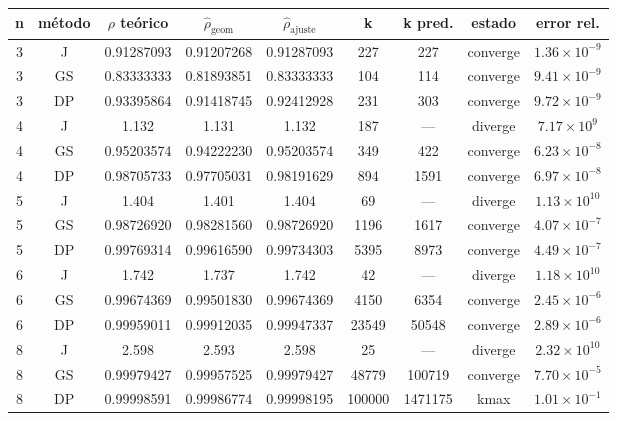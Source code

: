 {\scriptsize
\begin{tabular}{ccccccccc}
\toprule
\rowcolor{Azul1!50}
n & método & $\rho$ teórico & $\hat\rho_{\mathrm{geom}}$ & $\hat\rho_{\mathrm{ajuste}}$ & k & k pred. & estado & error rel. \\
\midrule
3 & J & 0.91287093 & 0.91207268 & 0.91287093 & 227 & 227 & converge & $1.36\times10^{-9}$ \\
3 & GS & 0.83333333 & 0.81893851 & 0.83333333 & 104 & 114 & converge & $9.41\times10^{-9}$ \\
3 & DP & 0.93395864 & 0.91418745 & 0.92412928 & 231 & 303 & converge & $9.72\times10^{-9}$ \\
4 & J & 1.132 & 1.131 & 1.132 & 187 & --- & diverge & $7.17\times10^{9}$ \\
4 & GS & 0.95203574 & 0.94222230 & 0.95203574 & 349 & 422 & converge & $6.23\times10^{-8}$ \\
4 & DP & 0.98705733 & 0.97705031 & 0.98191629 & 894 & 1591 & converge & $6.97\times10^{-8}$ \\
5 & J & 1.404 & 1.401 & 1.404 & 69 & --- & diverge & $1.13\times10^{10}$ \\
5 & GS & 0.98726920 & 0.98281560 & 0.98726920 & 1196 & 1617 & converge & $4.07\times10^{-7}$ \\
5 & DP & 0.99769314 & 0.99616590 & 0.99734303 & 5395 & 8973 & converge & $4.49\times10^{-7}$ \\
6 & J & 1.742 & 1.737 & 1.742 & 42 & --- & diverge & $1.18\times10^{10}$ \\
6 & GS & 0.99674369 & 0.99501830 & 0.99674369 & 4150 & 6354 & converge & $2.45\times10^{-6}$ \\
6 & DP & 0.99959011 & 0.99912035 & 0.99947337 & 23549 & 50548 & converge & $2.89\times10^{-6}$ \\
8 & J & 2.598 & 2.593 & 2.598 & 25 & --- & diverge & $2.32\times10^{10}$ \\
8 & GS & 0.99979427 & 0.99957525 & 0.99979427 & 48779 & 100719 & converge & $7.70\times10^{-5}$ \\
8 & DP & 0.99998591 & 0.99986774 & 0.99998195 & 100000 & 1471175 & kmax & $1.01\times10^{-1}$ \\
\bottomrule
\end{tabular}}
